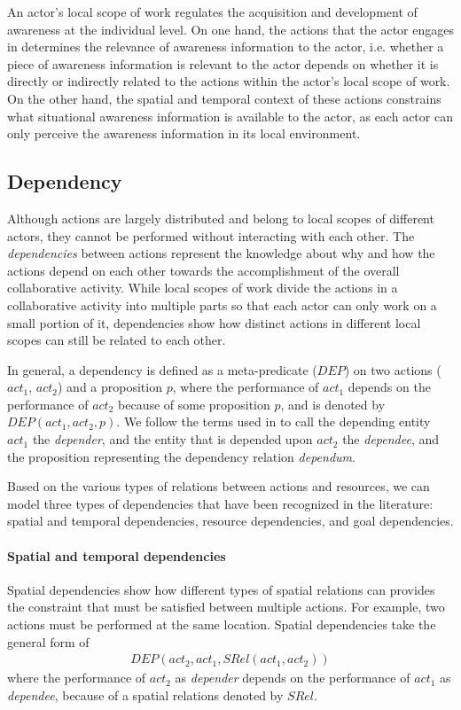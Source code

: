 An actor's local scope of work regulates the acquisition and development of awareness at the individual level. On one hand, the actions that the actor engages in determines the relevance of awareness information to the actor, i.e. whether a piece of awareness information is relevant to the actor depends on whether it is directly or indirectly related to the actions within the actor's local scope of work. On the other hand, the spatial and temporal context of these actions constrains what situational awareness information is available to the actor, as each actor can only perceive the awareness information in its local environment.

\subsection{Dependency} %
\label{sub:dependency}
Although actions are largely distributed and belong to local scopes of different actors, they cannot be performed without interacting with each other. The \emph{dependencies} between actions represent the knowledge about why and how the actions depend on each other towards the accomplishment of the overall collaborative activity. While local scopes of work divide the actions in a collaborative activity into multiple parts so that each actor can only work on a small portion of it, dependencies show how distinct actions in different local scopes can still be related to each other.

In general, a dependency is defined as a meta-predicate ($DEP$) on two actions ($act_1$, $act_2$) and a proposition $p$, where the performance of $act_1$ depends on the performance of $act_2$ because of some proposition $p$, and is denoted by $DEP(act_1, act_2, p)$. We follow the terms used in \cite{yu1993actor} to call the depending entity $act_1$ the \emph{depender}, and the entity that is depended upon $act_2$ the \emph{dependee}, and the proposition representing the dependency relation \emph{dependum}.

Based on the various types of relations between actions and resources, we can model three types of dependencies that have been recognized in the literature: spatial and temporal dependencies, resource dependencies, and goal dependencies.

\paragraph*{Spatial and temporal dependencies} %
\label{par:temporal_dependencies}
Spatial dependencies show how different types of spatial relations can provides the constraint that must be satisfied between multiple actions. For example, two actions must be performed at the same location. Spatial dependencies take the general form of 
\begin{align*} 
	DEP(act_2, act_1, SRel(act_1, act_2))
\end{align*}
where the performance of $act_2$ as \emph{depender} depends on the performance of $act_1$ as \emph{dependee}, because of a spatial relations denoted by $SRel$.

